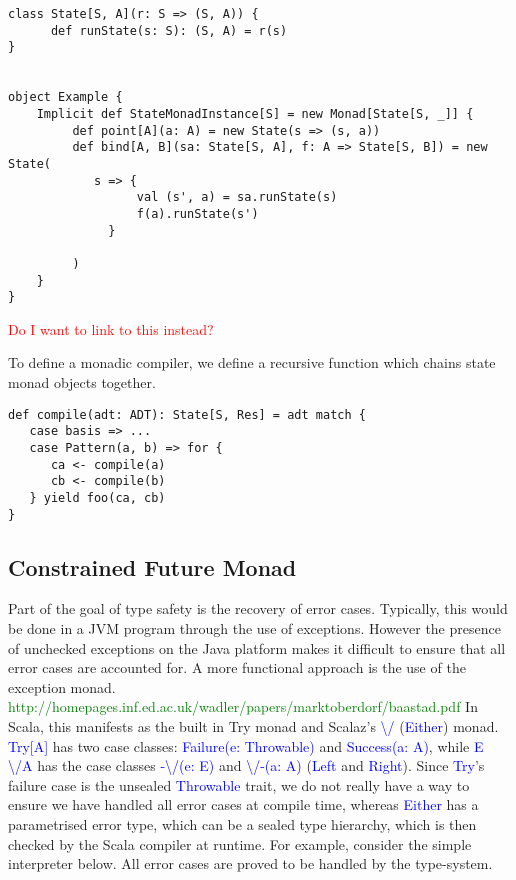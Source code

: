 \documentclass[12pt,a4paper,twoside,openright]{report}
\newcommand\todo[1]{\textcolor{red}{#1}}
\newcommand\codeName[1]{\textcolor{blue}{#1}}
\newcommand\toReference[1]{\textcolor{green}{#1}}
\newcommand\either[0]{\textbackslash/}
\newcommand\eitherR[0]{\textbackslash/-}
\newcommand\eitherL[0]{-\textbackslash/}
\renewcommand{\baselinestretch}{1.1}    %
\begin{document}
{\renewcommand{\baselinestretch}{0.8}\small
\begin{verbatim}
class State[S, A](r: S => (S, A)) {
      def runState(s: S): (S, A) = r(s)
}


object Example {
    Implicit def StateMonadInstance[S] = new Monad[State[S, _]] {
         def point[A](a: A) = new State(s => (s, a))
         def bind[A, B](sa: State[S, A], f: A => State[S, B]) = new State(
            s => {
                  val (s', a) = sa.runState(s)
                  f(a).runState(s')
              }
                
         )
    }
}
\end{verbatim}

\todo{Do I want to link to this instead?}

To define a monadic compiler, we define a recursive function which chains state monad objects together.

{\renewcommand{\baselinestretch}{0.8}\small
\begin{verbatim}
def compile(adt: ADT): State[S, Res] = adt match {
   case basis => ...
   case Pattern(a, b) => for {
      ca <- compile(a)
      cb <- compile(b)
   } yield foo(ca, cb) 
}
\end{verbatim}


	\subsection{Constrained Future Monad}
	Part of the goal of type safety is the recovery of error cases. Typically, this would be done in a JVM program through the use of exceptions. However the presence of unchecked exceptions on the Java platform makes it difficult to ensure that all error cases are accounted for. A more functional approach is the use of the exception monad. \toReference{http://homepages.inf.ed.ac.uk/wadler/papers/marktoberdorf/baastad.pdf} In Scala, this manifests as the built in Try monad and Scalaz's \codeName{\either} (\codeName{Either}) monad. \codeName{Try[A]} has two case classes: \codeName{Failure(e: Throwable)} and \codeName{Success(a: A)}, while \codeName{E \either A} has the case classes \codeName{\eitherL(e: E)} and \codeName{\eitherR(a: A)} (\codeName{Left} and \codeName{Right}). Since \codeName{Try}'s failure case is the unsealed \codeName{Throwable} trait, we do not really have a way to ensure we have handled all error cases at compile time, whereas \codeName{Either} has a parametrised error type, which can be a sealed type hierarchy, which is then checked by the Scala compiler at runtime. For example, consider the simple interpreter below. All error cases are proved to be handled by the type-system.
	
}}
\end{document}

